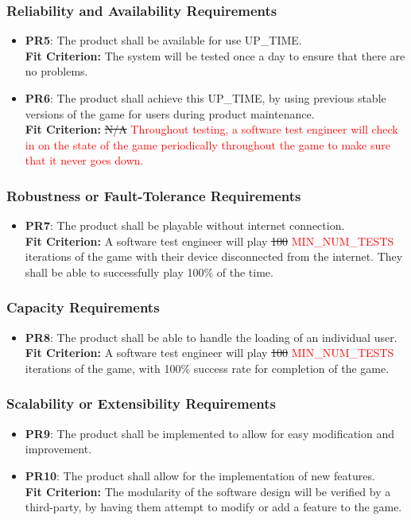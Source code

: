 \documentclass[12pt, titlepage]{article}
\begin{document}
\subsubsection{Reliability and Availability Requirements}
\begin{itemize}
\item \textbf{PR5}: The product shall be available for use UP\_TIME.\\
\textbf{Fit Criterion:} The system will be tested once a day to ensure that there are no problems.
\item \textbf{PR6}: The product shall achieve this UP\_TIME, by using previous stable versions of the game for users during product maintenance.\\
\textbf{Fit Criterion:} \sout{N/A} \textcolor{red}{Throughout testing, a software test engineer will check in on the state of the game periodically throughout the game to make sure that it never goes down.}
\end{itemize}

\subsubsection{Robustness or Fault-Tolerance Requirements}
\begin{itemize}
\item \textbf{PR7}: The product shall be playable without internet connection.\\
\textbf{Fit Criterion:} A software test engineer will play \sout{100} \textcolor{red}{MIN\_NUM\_TESTS} iterations of the game with their device disconnected from the internet. They shall be able to successfully play 100\% of the time.
\end{itemize}

\subsubsection{Capacity Requirements}
\begin{itemize}
\item \textbf{PR8}: The product shall be able to handle the loading of an individual user.\\
\textbf{Fit Criterion:} A software test engineer will play \sout{100} \textcolor{red}{MIN\_NUM\_TESTS} iterations of the game, with 100\% success rate for completion of the game.
\end{itemize}

\subsubsection{Scalability or Extensibility Requirements}
\begin{itemize}
\item \textbf{PR9}: The product shall be implemented to allow for easy modification and improvement.
\item \textbf{PR10}: The product shall allow for the implementation of new features.\\
\textbf{Fit Criterion:} The modularity of the software design will be verified by a third-party, by having them attempt to modify or add a feature to the game.
\end{itemize}
\end{document}

